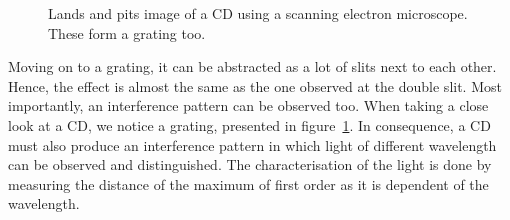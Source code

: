 \begin{minipage}{0.99\linewidth}
\begin{minipage}{0.25\linewidth}
\begin{scriptsize}
\begin{center}
\begin{figure}[H]
                    \caption{Lands and pits image of a CD using a scanning electron microscope. These form a grating too. \cite{src_cd}}
                    \label{fig_lands_pits}
                \end{figure}
            \end{center}
            \end{scriptsize}
        \end{minipage}
    \end{minipage}

    Moving on to a grating, it can be abstracted as a lot of slits next to each other.
    Hence, the effect is almost the same as the one observed at the double slit.
    Most importantly, an interference pattern can be observed too.
    When taking a close look at a CD, we notice a grating, presented in figure~\ref{fig_lands_pits}.
    In consequence, a CD must also produce an interference pattern in which light of different wavelength can be observed and distinguished.
    The characterisation of the light is done by measuring the distance of the maximum of first order as it is dependent of the wavelength.

